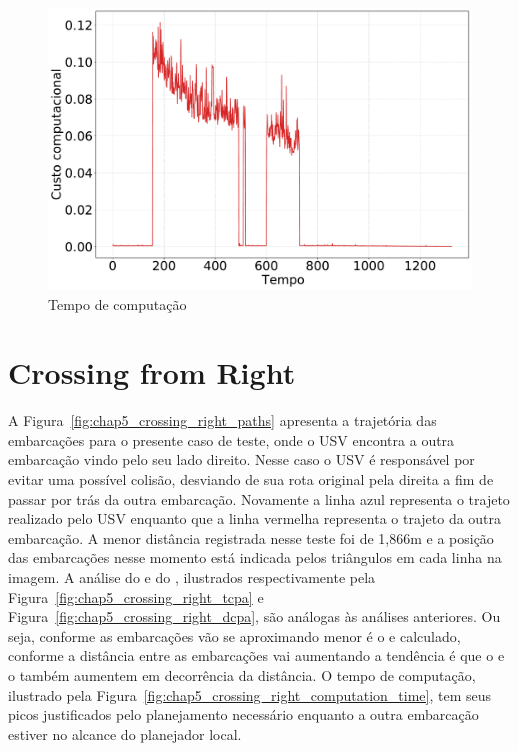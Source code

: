         \begin{figure}[H]
            \centering
            \includegraphics[width=\textwidth]{fig/chap5/crossing_left_computation_time.pdf}
            \caption{Tempo de computação}
            \label{fig:chap5_crossing_left_computation_time}
        \end{figure}
        
    \section{Crossing from Right} \label{subchap5_crossing_from_right}
        A Figura~\ref{fig:chap5_crossing_right_paths} apresenta a trajetória das embarcações para o presente caso de teste, onde o USV encontra a outra embarcação vindo pelo seu lado direito. Nesse caso o USV é responsável por evitar uma possível colisão, desviando de sua rota original pela direita a fim de passar por trás da outra embarcação. Novamente a linha azul representa o trajeto realizado pelo USV enquanto que a linha vermelha representa o trajeto da outra 
        embarcação. A menor distância registrada nesse teste foi de 1,866m e a posição das embarcações nesse momento está indicada pelos triângulos em cada linha na imagem. A análise do \tcpa e do \dcpa, ilustrados respectivamente pela Figura~\ref{fig:chap5_crossing_right_tcpa} e Figura~\ref{fig:chap5_crossing_right_dcpa}, são análogas às análises anteriores. Ou seja, conforme as embarcações vão se aproximando menor é o \tcpa e \dcpa calculado, conforme a distância entre as embarcações vai aumentando a tendência é que o \tcpa e o \dcpa também aumentem em decorrência da distância. O tempo de computação, ilustrado pela Figura~\ref{fig:chap5_crossing_right_computation_time}, tem seus picos justificados pelo planejamento necessário enquanto a outra embarcação estiver no alcance do planejador local.
    
